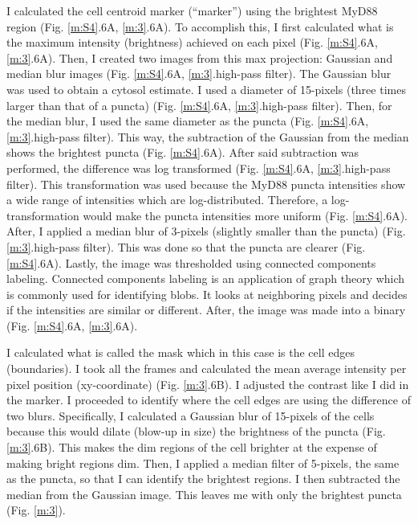 I calculated the cell centroid marker (“marker”) using the brightest MyD88 region (Fig. \ref{m:S4}.6A, \ref{m:3}.6A). To accomplish this, I first calculated what is the maximum intensity (brightness) achieved on each pixel (Fig. \ref{m:S4}.6A, \ref{m:3}.6A). Then, I created two images from this max projection: Gaussian and median blur images (Fig. \ref{m:S4}.6A, \ref{m:3}.high-pass filter). The Gaussian blur was used to obtain a cytosol estimate. I used a diameter of 15-pixels (three times larger than that of a puncta) (Fig. \ref{m:S4}.6A, \ref{m:3}.high-pass filter). Then, for the median blur, I used the same diameter as the puncta (Fig. \ref{m:S4}.6A, \ref{m:3}.high-pass filter). This way, the subtraction of the Gaussian from the median shows the brightest puncta (Fig. \ref{m:S4}.6A). After said subtraction was performed, the difference was log transformed (Fig. \ref{m:S4}.6A, \ref{m:3}.high-pass filter). This transformation was used because the MyD88 puncta intensities show a wide range of intensities which are log-distributed. Therefore, a log-transformation would make the puncta intensities more uniform (Fig. \ref{m:S4}.6A). After, I applied a median blur of 3-pixels (slightly smaller than the puncta) (Fig. \ref{m:3}.high-pass filter). This was done so that the puncta are clearer (Fig. \ref{m:S4}.6A). Lastly, the image was thresholded using connected components labeling. Connected components labeling is an application of graph theory which is commonly used for identifying blobs. It looks at neighboring pixels and decides if the intensities are similar or different. After, the image was made into a binary (Fig. \ref{m:S4}.6A, \ref{m:3}.6A).

I calculated what is called the mask which in this case is the cell edges (boundaries). I took all the frames and calculated the mean average intensity per pixel position (xy-coordinate) (Fig. \ref{m:3}.6B). I adjusted the contrast like I did in the marker. I proceeded to identify where the cell edges are using the difference of two blurs. Specifically, I calculated a Gaussian blur of 15-pixels of the cells because this would dilate (blow-up in size) the brightness of the puncta (Fig. \ref{m:3}.6B). This makes the dim regions of the cell brighter at the expense of making bright regions dim. Then, I applied a median filter of 5-pixels, the same as the puncta, so that I can identify the brightest regions. I then subtracted the median from the Gaussian image. This leaves me with only the brightest puncta (Fig. \ref{m:3}).


